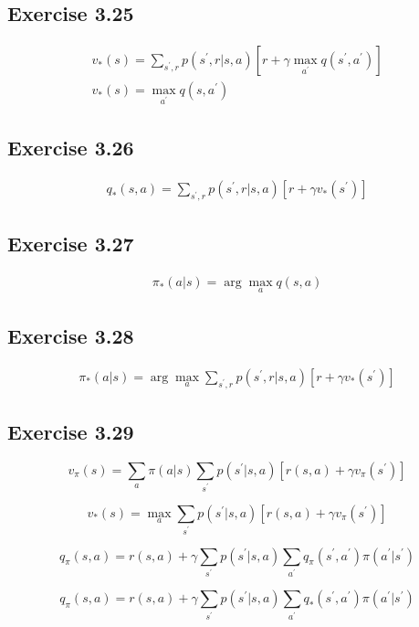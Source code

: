 \subsection{Exercise 3.25}

\begin{gather}
  v_*(s) = \sum_{s^\prime,r} p(s^\prime, r | s,a)[r + \gamma \max_{a^\prime} q(s^\prime, a^\prime)] \\
  v_*(s) = \max_{a^\prime} q(s,a^\prime)
\end{gather}

\subsection{Exercise 3.26}

\begin{gather}
  q_*(s,a) = \sum_{s^\prime, r} p(s^\prime,r|s,a)[r+\gamma v_*(s^\prime)]
\end{gather}

\subsection{Exercise 3.27}

\begin{gather}
  \pi_*(a|s) = \arg \max_a q(s,a) 
\end{gather}

\subsection{Exercise 3.28}

\begin{gather}
  \pi_*(a|s) = \arg \max_a \sum_{s^\prime, r} p(s^\prime,r|s,a)[r+\gamma v_*(s^\prime)]
\end{gather}

\subsection{Exercise 3.29}

\begin{equation}
  v_\pi(s) = \sum_{a}\pi(a|s) \sum_{s^\prime} p(s^\prime | s,a)[r(s,a) + \gamma v_\pi(s^\prime)] 
\end{equation}

\begin{equation}
  v_*(s) = \max_a \sum_{s^\prime} p(s^\prime | s,a)[r(s,a) + \gamma v_\pi(s^\prime)] 
\end{equation}

\begin{equation}
  q_\pi(s,a) = r(s,a) + \gamma \sum_{s^\prime} p(s^\prime|s,a) \sum_{a^\prime} q_\pi(s^\prime,a^\prime) \pi(a^\prime|s^\prime)
\end{equation}

\begin{equation}
  q_\pi(s,a) = r(s,a) + \gamma \sum_{s^\prime} p(s^\prime|s,a) \sum_{a^\prime} q_*(s^\prime,a^\prime) \pi(a^\prime|s^\prime)
\end{equation}